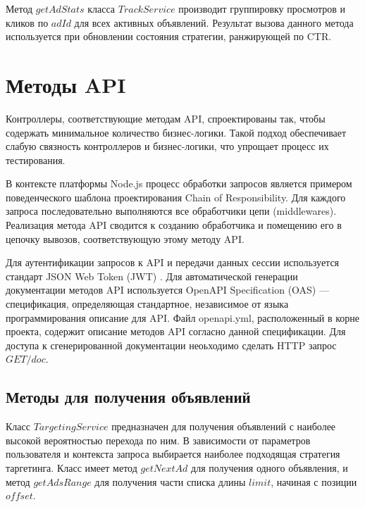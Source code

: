 \documentclass[specification,annotation,times]{itmo-student-thesis}
\begin{document}
Метод $getAdStats$ класса $TrackService$ производит группировку просмотров и кликов по $adId$ для всех активных объявлений. Результат вызова данного метода используется при обновлении состояния стратегии, ранжирующей по CTR. 






\section{Методы API}

Контроллеры, соответствующие методам API,  спроектированы так, чтобы содержать минимальное количество бизнес-логики. Такой подход обеспечивает слабую связность контроллеров и бизнес-логики, что упрощает процесс их тестирования.

В контексте платформы Node.js процесс обработки запросов является примером поведенческого шаблона проектирования Chain of Responsibility. Для каждого запроса последовательно выполняются все обработчики цепи (middlewares). Реализация метода API сводится к созданию обработчика и помещению его в цепочку вывозов, соответствующую этому методу API.

Для аутентификации запросов к API и передачи данных сессии используется стандарт JSON Web Token (JWT) \cite{JWT}. Для автоматической генерации документации методов API используется OpenAPI Specification (OAS) \cite{OAS} — спецификация, определяющая стандартное, независимое от языка программирования описание для API. Файл openapi.yml, расположенный в корне проекта, содержит описание методов API согласно данной спецификации. Для доступа к сгенерированной документации неоьходимо сделать HTTP запрос $GET /doc$.

\subsection{Методы для получения объявлений}


Класс $TargetingService$ предназначен для получения объявлений с наиболее высокой вероятностью перехода по ним. В зависимости от параметров пользователя и контекста запроса выбирается наиболее подходящая стратегия таргетинга. Класс имеет метод $getNextAd$ для получения одного объявления, и метод $getAdsRange$ для получения части списка длины $limit$, начиная с позиции $offset$.
\end{document}
